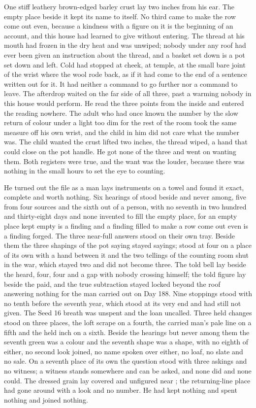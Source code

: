 One stiff leathery brown-edged barley crust lay two inches from his ear. The empty place beside it kept its name to itself. No third came to make the row come out even, because a kindness with a figure on it is the beginning of an account, and this house had learned to give without entering. The thread at his mouth had frozen in the dry heat and was unwiped; nobody under any roof had ever been given an instruction about the thread, and a basket set down is a pot set down and left. Cold had stopped at cheek, at temple, at the small bare joint of the wrist where the wool rode back, as if it had come to the end of a sentence written out for it. It had neither a command to go further nor a command to leave. The afterdrop waited on the far side of all three, past a warming nobody in this house would perform. He read the three points from the inside and entered the reading nowhere. The adult who had once known the number by the slow return of colour under a light too dim for the rest of the room took the same measure off his own wrist, and the child in him did not care what the number was. The child wanted the crust lifted two inches, the thread wiped, a hand that could close on the pot handle. He got none of the three and went on wanting them. Both registers were true, and the want was the louder, because there was nothing in the small hours to set the eye to counting.

He turned out the file as a man lays instruments on a towel and found it exact, complete and worth nothing. Six hearings of  stood beside and never among, five from four sources and the sixth out of a person, with no seventh in two hundred and thirty-eight days and none invented to fill the empty place, for an empty place kept empty is a finding and a finding filled to make a row come out even is a finding forged. The three near-full answers stood on their own tray. Beside them the three shapings of the pot saying stayed sayings;  stood at four on a place of its own with a hand between it and the two tellings of the counting room shut in the war, which stayed two and did not become three. The told bell lay beside the heard, four, four and a gap with nobody crossing himself; the told figure lay beside the paid, and the true subtraction stayed locked beyond the roof answering nothing for the man carried out on Day 188. Nine stoppings stood with no tenth before the seventh year, which stood at its very end and had still not given. The Seed 16 breath was unspent and the loan uncalled. Three held changes stood on three places, the loft scrape on a fourth, the carried man's pale line on a fifth and the held inch on a sixth. Beside the hearings but never among them the seventh green was a colour and the seventh shape was a shape, with no eighth of either, no second look joined, no name spoken over either, no loaf, no slate and no sale. On a seventh place of its own the question stood with three askings and no witness; a witness stands somewhere and can be asked, and none did and none could. The dressed grain lay covered and unfigured near ; the returning-line place had gone around with a look and no number. He had kept nothing and spent nothing and joined nothing.

